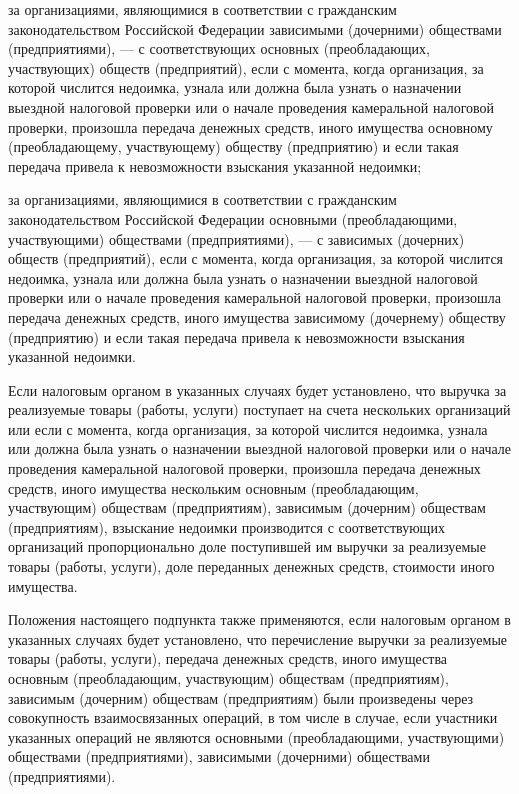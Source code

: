 \documentclass{report}
\begin{document}
\par за организациями, являющимися в соответствии с гражданским законодательством Российской Федерации зависимыми (дочерними) обществами (предприятиями), --- с соответствующих основных (преобладающих, участвующих) обществ (предприятий), если с момента, когда организация, за которой числится недоимка, узнала или должна была узнать о назначении выездной налоговой проверки или о начале проведения камеральной налоговой проверки, произошла передача денежных средств, иного имущества основному (преобладающему, участвующему) обществу (предприятию) и если такая передача привела к невозможности взыскания указанной недоимки;
\par за организациями, являющимися в соответствии с гражданским законодательством Российской Федерации основными (преобладающими, участвующими) обществами (предприятиями), --- с зависимых (дочерних) обществ (предприятий), если с момента, когда организация, за которой числится недоимка, узнала или должна была узнать о назначении выездной налоговой проверки или о начале проведения камеральной налоговой проверки, произошла передача денежных средств, иного имущества зависимому (дочернему) обществу (предприятию) и если такая передача привела к невозможности взыскания указанной недоимки.
\par Если налоговым органом в указанных случаях будет установлено, что выручка за реализуемые товары (работы, услуги) поступает на счета нескольких организаций или если с момента, когда организация, за которой числится недоимка, узнала или должна была узнать о назначении выездной налоговой проверки или о начале проведения камеральной налоговой проверки, произошла передача денежных средств, иного имущества нескольким основным (преобладающим, участвующим) обществам (предприятиям), зависимым (дочерним) обществам (предприятиям), взыскание недоимки производится с соответствующих организаций пропорционально доле поступившей им выручки за реализуемые товары (работы, услуги), доле переданных денежных средств, стоимости иного имущества.
\par Положения настоящего подпункта также применяются, если налоговым органом в указанных случаях будет установлено, что перечисление выручки за реализуемые товары (работы, услуги), передача денежных средств, иного имущества основным (преобладающим, участвующим) обществам (предприятиям), зависимым (дочерним) обществам (предприятиям) были произведены через совокупность взаимосвязанных операций, в том числе в случае, если участники указанных операций не являются основными (преобладающими, участвующими) обществами (предприятиями), зависимыми (дочерними) обществами (предприятиями).
\end{document}
